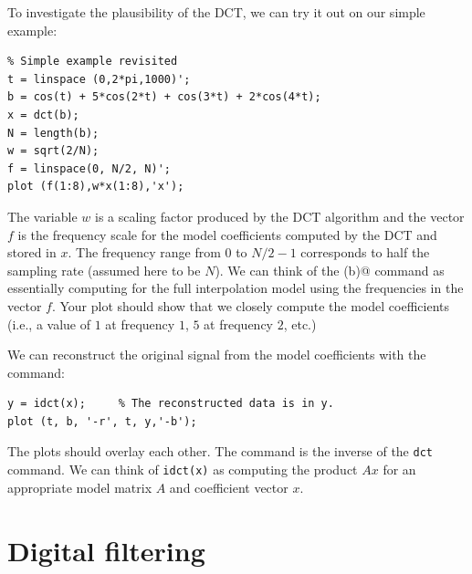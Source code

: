 \documentclass[10pt]{article}
\begin{document}
To investigate the plausibility of the DCT, we can try it out on our
simple example:
\begin{verbatim}
% Simple example revisited
t = linspace (0,2*pi,1000)';
b = cos(t) + 5*cos(2*t) + cos(3*t) + 2*cos(4*t);
x = dct(b);
N = length(b);
w = sqrt(2/N);
f = linspace(0, N/2, N)';
plot (f(1:8),w*x(1:8),'x');
\end{verbatim}
The variable $w$ is a scaling factor produced by the DCT algorithm and
the vector $f$ is the frequency scale for the model coefficients 
computed by the DCT and stored in $x$.
The frequency range from $0$ to $N/2 - 1$ corresponds to half
the sampling rate (assumed here to be $N$).
We can think of the \verb@dct(b)@ command as essentially computing
\verb@A\b@ for the full interpolation model using the frequencies
in the vector $f$.
Your plot should show that we closely compute the model coefficients 
(i.e., a value of $1$ at frequency $1$, $5$ at frequency $2$, etc.)

We can reconstruct the original signal from the model coefficients with
the command:
\begin{verbatim}
y = idct(x);     % The reconstructed data is in y.
plot (t, b, '-r', t, y,'-b');
\end{verbatim}
The plots should overlay each other. The \verb@idct@ command is the inverse
of the {\tt dct} command. We can think of {\tt idct(x)} as 
computing the product $Ax$ for an appropriate model matrix $A$ and
coefficient vector $x$.




\section*{Digital filtering}
\end{document}
